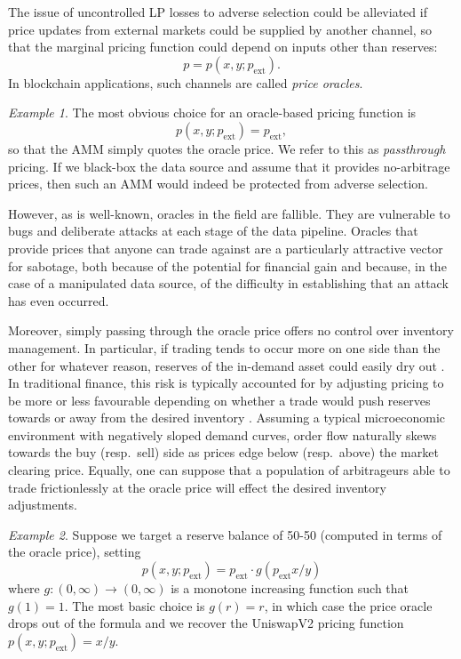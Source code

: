 \documentclass[a4paper,10pt]{article}
\theoremstyle{remark}
\newtheorem*{example}{Example}
\begin{document}
The issue of uncontrolled LP losses to adverse selection could be alleviated if price updates from external markets could be supplied by another channel, so that the marginal pricing function could depend on inputs other than reserves:
\[
  p = p(x,y;p_\mathrm{ext}).
\]
%
In blockchain applications, such channels are called \emph{price oracles}. 

\begin{example} The most obvious choice for an oracle-based pricing function is
\[
  p(x,y;p_\mathrm{ext}) = p_\mathrm{ext},
\]
so that the AMM simply quotes the oracle price.
%
We refer to this as \emph{passthrough} pricing.
%
If we black-box the data source and assume that it provides no-arbitrage prices, then such an AMM would indeed be protected from adverse selection. \end{example}

However, as is well-known, oracles in the field are fallible.
%
They are vulnerable to bugs and deliberate attacks at each stage of the data pipeline.
%
Oracles that provide prices that anyone can trade against are a particularly attractive vector for sabotage, both because of the potential for financial gain and because, in the case of a manipulated data source, of the difficulty in establishing that an attack has even occurred. 

Moreover, simply passing through the oracle price offers no control over inventory management.
%
In particular, if trading tends to occur more on one side than the other for whatever reason, reserves of the in-demand asset could easily dry out \cite[\S2.2]{garman1976market}.
%
In traditional finance, this risk is typically accounted for by adjusting pricing to be more or less favourable depending on whether a trade would push reserves towards or away from the desired inventory \cite{biais2005market}.
%
Assuming a typical microeconomic environment with negatively sloped demand curves, order flow naturally skews towards the buy (resp.~sell) side as prices edge below (resp.~above) the market clearing price.
%
Equally, one can suppose that a population of arbitrageurs able to trade frictionlessly at the oracle price will effect the desired inventory adjustments.

\begin{example}
  Suppose we target a reserve balance of 50-50 (computed in terms of the oracle price), setting
  \[
    p(x,y;p_\mathrm{ext}) = p_\mathrm{ext}\cdot g\left(p_\mathrm{ext}x/y\right)
  \]
  where $g:(0,\infty)\rightarrow(0,\infty)$ is a monotone increasing function such that $g(1) = 1$.
  The most basic choice is $g(r)=r$, in which case the price oracle drops out of the formula and we recover the UniswapV2 pricing function $p(x,y;p_\mathrm{ext})=x/y$.
\end{example}
\end{document}
